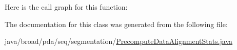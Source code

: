 Here is the call graph for this function\+:




The documentation for this class was generated from the following file\+:\begin{DoxyCompactItemize}
\item 
java/broad/pda/seq/segmentation/\hyperlink{_precompute_data_alignment_stats_8java}{Precompute\+Data\+Alignment\+Stats.\+java}\end{DoxyCompactItemize}
